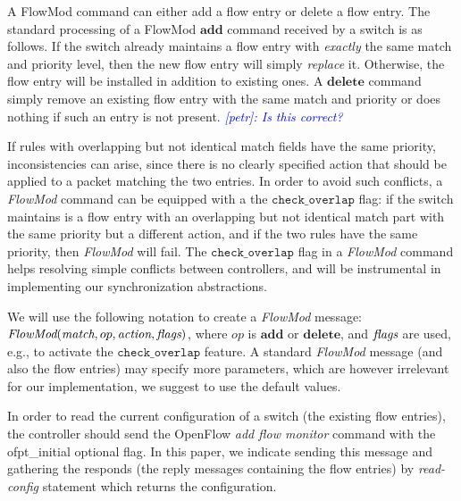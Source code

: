 \documentclass[conference]{sigcomm-alternate}
\newcommand{\hide}[1]{}
\newcommand{\add}{\textbf{add}\xspace}
\newcommand{\dele}{\textbf{delete}\xspace}
\newcommand{\FlowMod}{\emph{FlowMod}\xspace}
\newcommand{\match}{\emph{match}\xspace}
\newcommand{\action}{\emph{action}\xspace}
\newcommand{\flags}{\emph{flags}\xspace}
\newcommand{\checko}{\texttt{check\_overlap}\xspace}
\newcommand{\petr}[1]{\textit{\textcolor{blue}{[petr]: #1}}} %
\begin{document}
A FlowMod command can either add a flow entry or delete a flow entry.
The standard processing of a FlowMod $\add$ command received by a switch is
as follows. 
If the switch already maintains a flow entry with \emph{exactly} the
same match and priority level, then the new flow entry will simply \emph{replace} it.
Otherwise, the flow entry will be installed in addition to existing
ones.
A $\dele$ command simply remove an existing flow entry with the same
match and priority  or does nothing if such an entry is not present.
\petr{Is this correct?}


If rules with overlapping but not identical match fields have the same priority, 
inconsistencies can arise, since there is no clearly specified action
that should be applied to a packet matching the two entries.
In order to avoid such conflicts, a \emph{FlowMod} command can be equipped with a the $\checko$ flag:
if the switch maintains is a flow entry with an overlapping but not
identical match part with the same priority but a different action,
 and if the two rules have the same priority, then
\emph{FlowMod} will fail.
The $\checko$ flag in a \emph{FlowMod} command helps resolving simple
conflicts between controllers, and will be instrumental
in implementing our synchronization abstractions.  

We will use the following notation to create a \emph{FlowMod} message:
$\FlowMod(\match, op, \action, \flags)$, where 
$op$ is $\add$ or $\dele$, and $\flags$ are used, e.g.,  to activate the $\checko$
feature.
A standard \emph{FlowMod} message (and also the flow entries) may specify
more parameters, which are however irrelevant for our implementation, we suggest to
use the default values.

In order to read the current configuration of a switch (the existing flow entries), the controller should send
the OpenFlow \emph{add flow monitor} command with the \textsf{ofpt\_initial} optional flag.
In this paper, we indicate sending this message and gathering the
responds (the reply messages containing the flow entries) 
by \textit{read-config} statement which returns the configuration.

\hide{
We also remark that our solution is only based on flow tables
and does not make use
of \emph{OpenFlow group tables}, nor do we make use of \emph{cookies}: rules
are always identified by exact matches.
}
\end{document}
